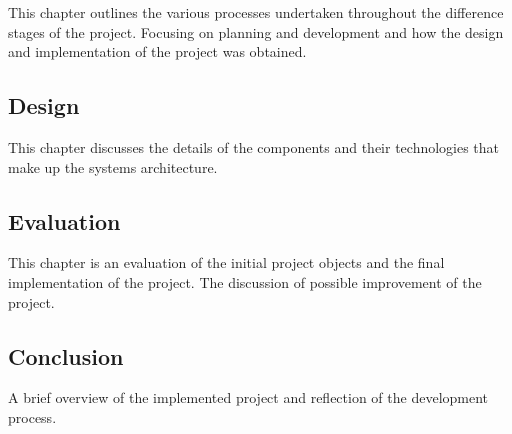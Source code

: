 This chapter outlines the various processes undertaken throughout the difference stages of the project.  Focusing on planning and development and how the design and implementation of the project was obtained.

\subsection{Design}
This chapter discusses the details of the components and their technologies that make up the systems architecture.

\subsection{Evaluation}
This chapter is an evaluation of the initial project objects and the final implementation of the project. The discussion of possible improvement of the project.

\subsection{Conclusion}
A brief overview of the implemented project and reflection of the development process.
